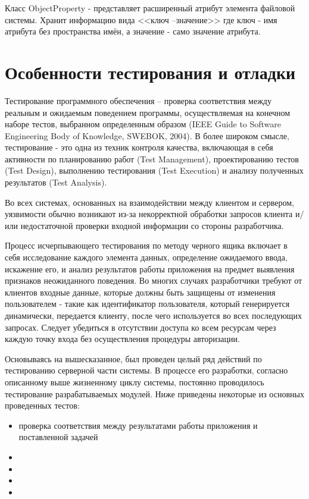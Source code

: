 \documentclass[utf8,usehyperref,12pt]{G7-32}
\begin{document}
Класс ObjectProperty - представляет расширенный атрибут элемента файловой системы. Хранит информацию вида <<ключ --значение>> где ключ - имя атрибута без пространства имён, а значение - само значение атрибута.

\section{Особенности тестирования и отладки}

Тестирование программного обеспечения – проверка соответствия между реальным и ожидаемым поведением программы, осуществляемая на конечном наборе тестов, выбранном определенным образом (IEEE Guide to Software Engineering Body of Knowledge, SWEBOK, 2004). В более широком смысле, тестирование - это одна из техник контроля качества, включающая в  себя активности по планированию работ (Test Management), проектированию тестов (Test Design), выполнению тестирования (Test Execution) и анализу полученных результатов (Test Analysis).

Во всех системах, основанных на взаимодействии между клиентом и сервером, уязвимости обычно возникают из-за некорректной обработки запросов клиента и/или недостаточной проверки входной информации со стороны разработчика. 

Процесс исчерпывающего тестирования по методу черного ящика включает в себя исследование каждого элемента данных, определение ожидаемого ввода, искажение его, и анализ результатов работы приложения на предмет выявления признаков неожиданного поведения. Во многих случаях разработчики требуют от клиентов входные данные, которые должны быть защищены от изменения пользователем - такие как идентификатор пользователя, который генерируется динамически, передается клиенту, после чего используется во всех последующих запросах. Следует убедиться в отсутствии доступа ко всем ресурсам через каждую точку входа без осуществления процедуры авторизации.

Основываясь на вышесказанное, был проведен целый ряд действий по тестированию серверной части системы. В процессе его разработки, согласно описанному выше жизненному циклу системы, постоянно проводилось тестирование разрабатываемых модулей. Ниже приведены некоторые из основных проведенных тестов:
\begin{itemize}
 \item проверка соответствия между результатами работы приложения и поставленной задачей
 \item 
 \item 
 \item 
 \item 
\end{itemize}
\end{document}
